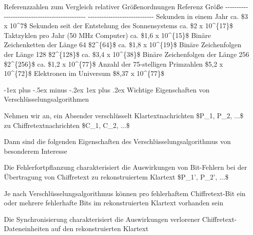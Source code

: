 \documentclass[a4paper]{article}
\makeatletter
\renewcommand{\subsubsection}{\@startsection{subsubsection}{3}{0mm}%
 {-1ex plus -.5ex minus -.2ex}%
 {1ex plus .2ex}%
 {\normalfont\small\bfseries}}
\makeatother
\begin{document}
\begin{multicols}{3}
      Referenzzahlen zum Vergleich relativer Größenordnungen \textbar{}
      Referenz \textbar{} Größe \textbar{} \textbar{}
      -\/-\/-\/-\/-\/-\/-\/-\/-\/-\/-\/-\/-\/-\/-\/-\/-\/-\/-\/-\/-\/-\/-\/-\/-\/-\/-\/-\/-\/-\/-\/-\/-\/-\/-\/-\/-\/-\/-\/-\/-\/-\/-\/-\/-\/-
      \textbar{}
      -\/-\/-\/-\/-\/-\/-\/-\/-\/-\/-\/-\/-\/-\/-\/-\/-\/-\/-\/-\/-\/-\/-\/-\/-\/-\/-\/-\/-
      \textbar{} \textbar{} Sekunden in einem Jahr \textbar{} ca. \$3 x
      10\^{}7\$ \textbar{} \textbar{} Sekunden seit der Entstehung des
      Sonnensystems \textbar{} ca. \$2 x 10\^{}\{17\}\$ \textbar{} \textbar{}
      Taktzyklen pro Jahr (50 MHz Computer) \textbar{} ca. \$1,6 x
      10\^{}\{15\}\$ \textbar{} \textbar{} Binäre Zeichenketten der Länge 64
      \textbar{} \$2\^{}\{64\}\$ ca. \$1,8 x 10\^{}\{19\}\$ \textbar{}
      \textbar{} Binäre Zeichenfolgen der Länge 128 \textbar{}
      \$2\^{}\{128\}\$ ca. \$3,4 x 10\^{}\{38\}\$ \textbar{} \textbar{} Binäre
      Zeichenfolgen der Länge 256 \textbar{} \$2\^{}\{256\}\$ ca. \$1,2 x
      10\^{}\{77\}\$ \textbar{} \textbar{} Anzahl der 75-stelligen Primzahlen
      \textbar{} \$5,2 x 10\^{}\{72\}\$ \textbar{} \textbar{} Elektronen im
      Universum \textbar{} \$8,37 x 10\^{}\{77\}\$ \textbar{}


      \subsubsection{Wichtige Eigenschaften von
            Verschlüsselungsalgorithmen}

      Nehmen wir an, ein Absender verschlüsselt Klartextnachrichten \$P\_1,
      P\_2, ...\$ zu Chiffretextnachrichten \$C\_1, C\_2, ...\$

      Dann sind die folgenden Eigenschaften des Verschlüsselungsalgorithmus
      von besonderem Interesse

      \begin{itemize*}
            \item
            Die Fehlerfortpflanzung charakterisiert die Auswirkungen von
            Bit-Fehlern bei der Übertragung von Chiffretext zu rekonstruiertem
            Klartext \$P\_1', P\_2', ...\$

            \begin{itemize*}
                  \item Je nach Verschlüsselungsalgorithmus können pro fehlerhaftem Chiffretext-Bit ein oder mehrere fehlerhafte Bits im rekonstruierten Klartext vorhanden sein
            \end{itemize*}
            \item
            Die Synchronisierung charakterisiert die Auswirkungen verlorener
            Chiffretext-Dateneinheiten auf den rekonstruierten Klartext


\end{itemize*}
\end{multicols}
\end{document}
